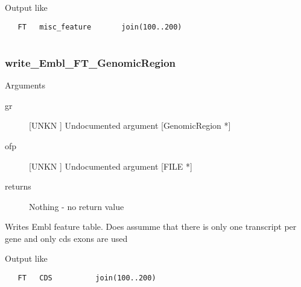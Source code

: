 Output like


\begin{verbatim}
   FT   misc_feature       join(100..200)


\end{verbatim}
\subsubsection{write_Embl_FT_GenomicRegion}

Arguments
\begin{description}
\item[gr] [UNKN ] Undocumented argument [GenomicRegion *]
\item[ofp] [UNKN ] Undocumented argument [FILE *]
\item[returns] Nothing - no return value
\end{description}
Writes Embl feature table. Does assumme that
there is only one transcript per gene and only
cds exons are used


Output like


\begin{verbatim}
   FT   CDS          join(100..200)


\end{verbatim}
